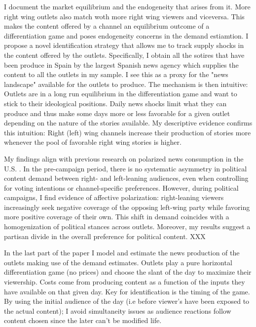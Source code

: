 \documentclass[12pt]{article}
\begin{document}
I document the market equilibrium and the endogeneity that arises from it. More right wing outlets also match woth more right wing viewers and viceversa. This makes the content offered by a channel an equilibrium outcome of a differentiation game and poses endogeneity concerns in the demand estiamtion. I propose a novel identification strategy that allows me to track supply shocks in the content offered by the outlets. Specifically, I obtain all the sotires that have been produce in Spain by the largest Spanish news agency which supplies the content to all the outlets in my sample. I see this as a proxy for the "news landscape" available for the outlets to produce. The mechanism is then intuitive: Outlets are in a long run equilibrium in the differentiation game and want to stick to their ideological positions. Daily news shocks limit what they can produce and thus make some days more or less favorable for a given outlet depending on the nature of the stories available. My descriptive evidence confirms this intuition: Right (left) wing channels increase their production of stories more whenever the pool of favorable right wing stories is higher. 



My findings align with previous research on polarized news consumption in the U.S. \citep{Peterson2017Echo}. In the pre-campaign period, there is no systematic asymmetry in political content demand between right- and left-leaning audiences, even when controlling for voting intentions or channel-specific preferences. However, during political campaigns, I find evidence of affective polarization: right-leaning viewers increasingly seek negative coverage of the opposing left-wing party while favoring more positive coverage of their own. This shift in demand coincides with a homogenization of political stances across outlets. Moreover, my results suggest a partisan divide in the overall preference for political content. XXX


In the last part of the paper I model and estimate the news production of the outlets making use of the demand estimates. Outlets play a pure horizontal differentiation game (no prices) and choose the slant of the day to maximize their viewership. Costs come from producing content as a function of the inputs they have available on that given day. Key for identification is the timing of the game. By using the initial audience of the day (i.e before viewer's have been exposed to the actual content); I avoid simultaneity issues as audience reactions follow content chosen since the later can't be modified life. 
\end{document}
